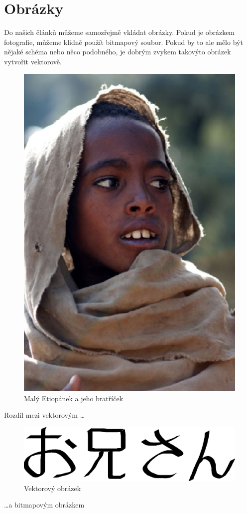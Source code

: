 \documentclass[a4paper, 11pt]{article}
\begin{document}
	\section{Obrázky}
	Do našich článků můžeme samozřejmě vkládat obrázky. Pokud je obrázkem fotografie, můžeme klidně použít bitmapový soubor. Pokud by to ale mělo být nějaké schéma nebo něco podobného, je dobrým zvykem takovýto obrázek vytvořit vektorově.
	
	\begin{figure}[h]
	    \centering
	    \includegraphics[scale=0.4]{etiopan.eps}
	    \caption{Malý Etiopánek a jeho bratříček}
	    \label{Img_1}
	\end{figure}
	
	Rozdíl mezi vektorovým \dots
	
	\begin{figure}[h]
	    \centering
	    \includegraphics[scale=0.4]{oniisan.eps}
	    \caption{Vektorový obrázek}
	    \label{Img_2}
	    \bigskip
	\end{figure}
	
	\noindent\dots a bitmapovým obrázkem

    \begin{figure}[h]
	    \centering
	    \incl
\end{figure}
\end{document}
